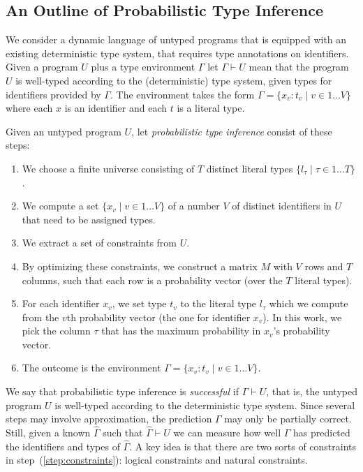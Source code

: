 \documentclass[sigplan,10pt,review,anonymous]{acmart} %
\theoremstyle{plain}
\theoremstyle{remark}
\theoremstyle{definition}
\begin{document}
\subsection{An Outline of Probabilistic Type Inference}

We consider a dynamic language of untyped programs that is equipped with an existing deterministic type system,
that requires type annotations on identifiers.
%
Given a program $U$ plus a type environment $\Gamma$ let $\Gamma \vdash U$ mean that the program $U$ is well-typed according to the (deterministic) type system, given types for identifiers provided by $\Gamma$.
%
The environment takes the form $\Gamma = \{ x_v : t_v \mid v \in 1 \ldots V\}$ where each $x$ is an identifier and each $t$ is a literal type.

Given an untyped program $U$,
let \emph{probabilistic type inference} consist of these steps:
\begin{enumerate}
	\item We choose a finite universe consisting of $T$ distinct literal types $\{ l_\tau \mid \tau \in 1 \dots T \}$.
	\item We compute a set $\{ x_v \mid v \in 1 \ldots V\}$ of a number $V$ of distinct identifiers in $U$ that need to be assigned types.
	\item \label{step:constraints} We extract a set of constraints from $U$.
	\item \label{step:optimize} By optimizing these constraints, we construct a matrix $M$ with $V$ rows and $T$ columns,
	      such that each row is a probability vector (over the $T$ literal types).
	\item For each identifier $x_v$, we set type $t_v$ to the literal type $l_\tau$ which we compute from the $v$th probability vector (the one for identifier $x_v$).  In this work, we pick the column $\tau$ that has the maximum probability in $x_v$'s probability vector.
	\item The outcome is the environment $\Gamma = \{ x_v : t_v \mid v \in 1 \ldots V\}$.
\end{enumerate}

We say that probabilistic type inference is \emph{successful} if $\Gamma \vdash U$, that is, the untyped program $U$ is well-typed according to the deterministic type system.
%
Since several steps may involve approximation, the prediction $\Gamma$ may only be partially correct.
%
Still, given a known $\hat{\Gamma}$ such that $\hat{\Gamma} \vdash U$ we can measure how well $\Gamma$ has predicted the identifiers and types of $\hat{\Gamma}$.
%
A key idea is that there are two sorts of constraints in step~(\ref{step:constraints}): logical constraints and natural
constraints.
\end{document}
